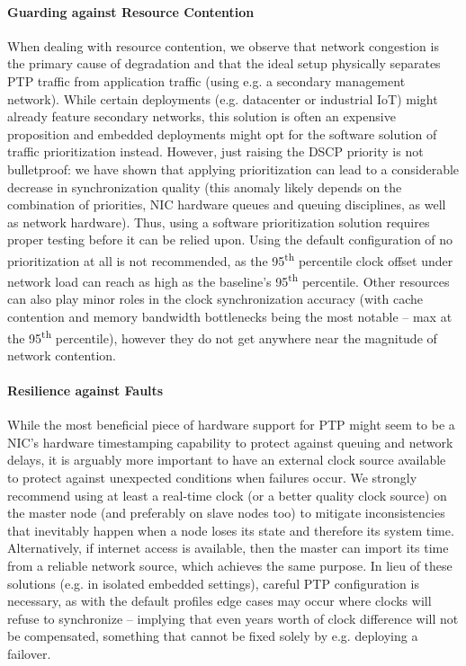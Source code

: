 \paragraph{Guarding against Resource Contention}
When dealing with resource contention, we observe that network congestion is the primary cause of degradation and that the ideal setup physically separates PTP traffic from application traffic (using e.g. a secondary management network). While certain deployments (e.g. datacenter or industrial IoT) might already feature secondary networks, this solution is often an expensive proposition and embedded deployments might opt for the software solution of traffic prioritization instead. However, just raising the DSCP priority is not bulletproof: we have shown that applying prioritization can lead to a considerable decrease in synchronization quality (this anomaly likely depends on the combination of priorities, NIC hardware queues and queuing disciplines, as well as network hardware). Thus, using a software prioritization solution requires proper testing before it can be relied upon. Using the default configuration of no prioritization at all is not recommended, as the 95\textsuperscript{th} percentile clock offset under network load can reach as high as \fRatio[-2]{\cmpMax} the baseline's 95\textsuperscript{th} percentile. Other resources can also play minor roles in the clock synchronization accuracy (with cache contention and memory bandwidth bottlenecks being the most notable -- max  at the 95\textsuperscript{th} percentile), however they do not get anywhere near the magnitude of network contention.

\paragraph{Resilience against Faults} While the most beneficial piece of hardware support for PTP might seem to be a NIC's hardware timestamping capability to protect against queuing and network delays, it is arguably more important to have an external clock source available to protect against unexpected conditions when failures occur. We strongly recommend using at least a real-time clock (or a better quality clock source) on the master node (and preferably on slave nodes too) to mitigate inconsistencies that inevitably happen when a node loses its state and therefore its system time. Alternatively, if internet access is available, then the master can import its time from a reliable network source, which achieves the same purpose. In lieu of these solutions (e.g. in isolated embedded settings), careful PTP configuration is necessary, as with the default profiles edge cases may occur where clocks will refuse to synchronize -- implying that even years worth of clock difference will not be compensated, something that cannot be fixed solely by e.g. deploying a failover.

